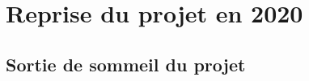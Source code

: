 \documentclass[11pt,twoside,a4paper]{article}
\begin{document}
%

\clearpage

\section{Reprise du projet en 2020}

\subsection{Sortie de sommeil du projet}
\end{document}

